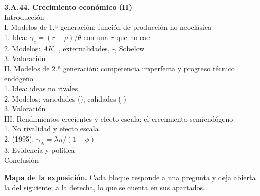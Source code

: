 \documentclass[11pt]{article}
\begin{document}
\begin{esquema}
\textbf{3.A.44. Crecimiento económico (II)}\\[2pt]
Introducción\\
I. Modelos de 1.ª generación: función de producción no neoclásica\\
\hspace*{1.5em}1. Idea: $\gamma_c=(r-\rho)/\theta$ con una $r$ que no cae\\
\hspace*{1.5em}2. Modelos: $AK$, , externalidades, -, Sobelow\\
\hspace*{1.5em}3. Valoración\\
II. Modelos de 2.ª generación: competencia imperfecta y progreso técnico endógeno\\
\hspace*{1.5em}1. Idea: ideas no rivales\\
\hspace*{1.5em}2. Modelos: variedades (), calidades (-)\\
\hspace*{1.5em}3. Valoración\\
III. Rendimientos crecientes y efecto escala: el crecimiento semiendógeno\\
\hspace*{1.5em}1. No rivalidad y efecto escala\\
\hspace*{1.5em}2.  (1995): $\gamma_N=\lambda n/(1-\phi)$\\
\hspace*{1.5em}3. Evidencia y política\\
Conclusión
\end{esquema}

\begin{anotaciones}
\textbf{Mapa de la exposición.} Cada bloque responde a una pregunta y deja abierta la del siguiente; a la derecha, lo que se cuenta en sus apartados.
\begin{infografiacaja}
\caption{Mapa de la exposición: la pregunta de cada bloque y el hilo que los une}\label{figu:mapa-tema}
\end{infografiacaja}
\end{anotaciones}
\end{document}
